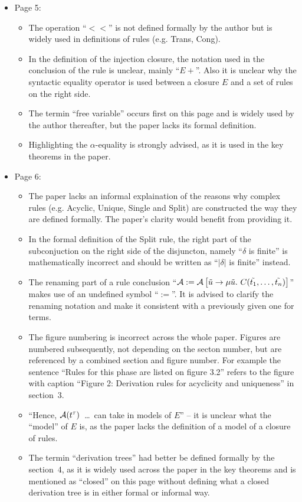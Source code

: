 \begin{itemize}
	\item Page 5:
	\begin{itemize}
		\item The operation ``$<<$'' is not defined formally by the author but is widely used in definitions of rules (e.g. Trans, Cong).
		\item In the definition of the injection closure, the notation used in the conclusion of the rule is unclear, mainly ``$E+$''. Also it is unclear why the syntactic equality operator is used between a closure $E$ and a set of rules on the right side.
		\item The termin ``free variable'' occurs first on this page and is widely used by the author thereafter, but the paper lacks its formal definition.
		\item Highlighting the $\alpha$-equality is strongly advised, as it is used in the key theorems in the paper.
	\end{itemize}

	\item Page 6:
	\begin{itemize}
		\item The paper lacks an informal explaination of the reasons why complex rules (e.g. Acyclic, Unique, Single and Split) are constructed the way they are defined formally. The paper's clarity would benefit from providing it.
		\item In the formal definition of the Split rule, the right part of the subconjuction on the right side of the disjuncton, namely ``$\delta$ is finite'' is mathematically incorrect and should be written as ``$|\delta|$ is finite'' instead.
		\item The renaming part of a rule conclusion ``$\mathcal{A} := \mathcal{A}\left[ \tilde{u} \rightarrow \mu \tilde{u}.\ C(\tilde{t_1},\dots,\tilde{t_n}) \right]$'' makes use of an undefined symbol ``$:=$''. It is advised to clarify the renaming notation and make it consistent with a previously given one for terms.
		\item The figure numbering is incorrect across the whole paper. Figures are numbered subsequently, not depending on the secton number, but are referenced by a combined section and figure number. For example the sentence ``Rules for this phase are listed on figure 3.2'' refers to the figure with caption ``Figure 2: Derivation rules for acyclicity and uniqueness'' in section~3.
		\item ``Hence, $\mathcal{A}(t^\tau)$~\dots~can take in models of $E$'' -- it is unclear what the ``model'' of $E$ is, as the paper lacks the definition of a model of a closure of rules.
		\item The termin ``derivation trees'' had better be defined formally by the section~4, as it is widely used across the paper in the key theorems and is mentioned as ``closed'' on this page without defining what a closed derivation tree is in either formal or informal way.
	\end{itemize}


\end{itemize}
